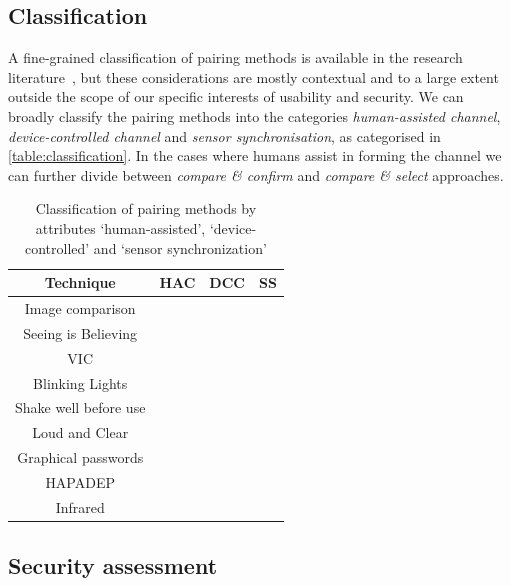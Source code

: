 \documentclass[conference, 11pt]{sty/IEEEtran}
\begin{document}
\subsection{Classification}
A fine-grained classification of pairing methods is available in the research literature~\cite{chong2012usability}, but these considerations are mostly contextual and to a large extent outside the scope of our specific interests of usability and security.
We can broadly classify the pairing methods into the categories \emph{human-assisted channel}, \emph{device-controlled channel} and \emph{sensor synchronisation}, as categorised in \autoref{table:classification}.
In the cases where humans assist in forming the channel we can further divide between \textit{compare \& confirm} and \textit{compare \& select} approaches.

\begin{table}[h]
    \centering
    \normalsize{
\begin{tabular}{c|c|c|c}
	Technique & HAC & DCC & SS \\
	\hline
	Image comparison & \checkmark &  & \\
	  Seeing is Believing &  & \checkmark &   \\
	   VIC & & \checkmark  & \\
	   Blinking Lights & \checkmark &  & \\
	Shake well before use &  &  & \checkmark \\
	       Loud and Clear & \checkmark & \checkmark & \\
    	  Graphical passwords & \checkmark &  &  \\
	 HAPADEP &  & \checkmark & \checkmark \\
	Infrared &  & \checkmark &  \\
\end{tabular}
    }
    \label{fig:classification}
    \caption{Classification of pairing methods by attributes `human-assisted', `device-controlled' and `sensor synchronization'}
\end{table}

\subsection{Security assessment}
\label{ssec:security_assessment}
\end{document}
